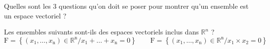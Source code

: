 Quelles sont les $3$ questions qu'on doit se poser pour montrer qu'un ensemble est un espace vectoriel ?

\vspace{2em}

Les ensembles suivants sont-ils des espaces vectoriels inclus dans $\mathbb{R}^n$ ? 
$$ \mathrm{F}=\left\{\left(x_1, \ldots, x_{\mathrm{n}}\right) \in \mathbb{R}^{\mathrm{n}} / x_1+\ldots+x_{\mathrm{n}}=0\right\} \qquad 
    \mathrm{F}=\left\{\left(x_1, \ldots, x_{\mathrm{n}}\right) \in \mathbb{R}^{\mathrm{n}} / x_1 \times x_2=0\right\}
    $$